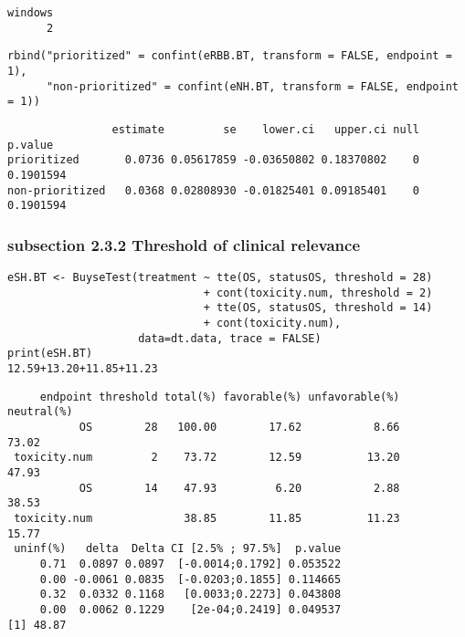 \documentclass[12pt]{article}
\begin{document}
\begin{verbatim}
windows 
      2
\end{verbatim}


\lstset{language=r,label= ,caption= ,captionpos=b,numbers=none}
\begin{lstlisting}
rbind("prioritized" = confint(eRBB.BT, transform = FALSE, endpoint = 1),
      "non-prioritized" = confint(eNH.BT, transform = FALSE, endpoint = 1))

\end{lstlisting}

\begin{verbatim}
                estimate         se    lower.ci   upper.ci null   p.value
prioritized       0.0736 0.05617859 -0.03650802 0.18370802    0 0.1901594
non-prioritized   0.0368 0.02808930 -0.01825401 0.09185401    0 0.1901594
\end{verbatim}

\subsubsection{subsection 2.3.2 Threshold of clinical relevance}
\label{sec:orgb9c24aa}
\lstset{language=r,label= ,caption= ,captionpos=b,numbers=none}
\begin{lstlisting}
eSH.BT <- BuyseTest(treatment ~ tte(OS, statusOS, threshold = 28)
                              + cont(toxicity.num, threshold = 2)
                              + tte(OS, statusOS, threshold = 14)
                              + cont(toxicity.num),
                    data=dt.data, trace = FALSE)
print(eSH.BT)
12.59+13.20+11.85+11.23
\end{lstlisting}

\begin{verbatim}
     endpoint threshold total(%) favorable(%) unfavorable(%) neutral(%)
           OS        28   100.00        17.62           8.66      73.02
 toxicity.num         2    73.72        12.59          13.20      47.93
           OS        14    47.93         6.20           2.88      38.53
 toxicity.num              38.85        11.85          11.23      15.77
 uninf(%)   delta  Delta CI [2.5% ; 97.5%]  p.value
     0.71  0.0897 0.0897  [-0.0014;0.1792] 0.053522
     0.00 -0.0061 0.0835  [-0.0203;0.1855] 0.114665
     0.32  0.0332 0.1168   [0.0033;0.2273] 0.043808
     0.00  0.0062 0.1229    [2e-04;0.2419] 0.049537
[1] 48.87
\end{verbatim}
\end{document}
